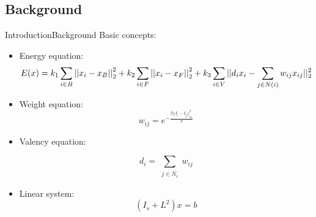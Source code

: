 \documentclass[10pt]{beamer}
\DeclarePairedDelimiter{\abs}{\lvert}{\rvert}
\begin{document}
\subsection{Background}
\begin{frame}{Introduction}{Background}
 Basic concepts:
\begin{itemize}
   
     \item Energy equation:
{     \footnotesize
        \begin{equation}
         E(x) = k_1 \sum_{i \in B} {||x_i-x_B||}^2_2 + k_2\sum_{i \in F} {||x_i-x_F||}^2_2 + k_3\sum_{i \in V} {\abs{\abs{d_i x_i-\sum_{j \in N(i)} { w_{ij} x_{ij}}}}_2^2}
    \end{equation}
   }
        \item Weight equation:
      \begin{equation}
      w_{ij} = e^{-\frac{\beta{||I_i - I_j||}^2 _{\infty}} {\sigma}}
  		\end{equation}

	\item Valency equation:
        
        \begin{equation}
    d_{i} = \sum_{\substack{j\in N_{i}}} w_{ij}
    	\end{equation}

 	\item Linear system:    
       \begin{equation}
       (I_{s} + L^{2})x = b
       \end{equation}
              
\end{itemize}
\end{frame}
\end{document}
